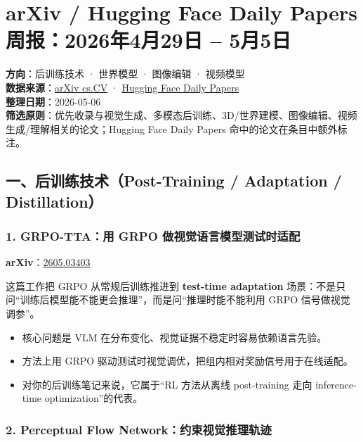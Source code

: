 
\section{arXiv / Hugging Face Daily Papers 周报：2026年4月29日 – 5月5日}

\begin{conceptbox}
\textbf{方向}：后训练技术 · 世界模型 · 图像编辑 · 视频模型\\
\textbf{数据来源}：\href{https://arxiv.org/list/cs.CV/recent}{arXiv cs.CV} · \href{https://huggingface.co/papers}{Hugging Face Daily Papers}\\
\textbf{整理日期}：2026-05-06\\
\textbf{筛选原则}：优先收录与视觉生成、多模态后训练、3D/世界建模、图像编辑、视频生成/理解相关的论文；Hugging Face Daily Papers 命中的论文在条目中额外标注。
\end{conceptbox}

\subsection{一、后训练技术（Post-Training / Adaptation / Distillation）}

\subsubsection{1. GRPO-TTA：用 GRPO 做视觉语言模型测试时适配}

\textbf{arXiv}：\href{https://arxiv.org/abs/2605.03403}{2605.03403}

这篇工作把 GRPO 从常规后训练推进到 \textbf{test-time adaptation} 场景：不是只问“训练后模型能不能更会推理”，而是问“推理时能不能利用 GRPO 信号做视觉调参”。

\begin{itemize}[leftmargin=1.5em]
  \item 核心问题是 VLM 在分布变化、视觉证据不稳定时容易依赖语言先验。
  \item 方法上用 GRPO 驱动测试时视觉调优，把组内相对奖励信号用于在线适配。
  \item 对你的后训练笔记来说，它属于“RL 方法从离线 post-training 走向 inference-time optimization”的代表。
\end{itemize}

\subsubsection{2. Perceptual Flow Network：约束视觉推理轨迹}


